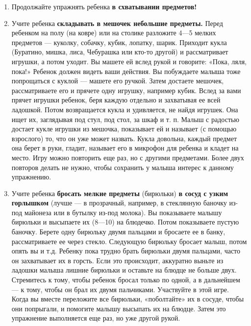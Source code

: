 \documentclass{book}
\begin{document}
\begin{enumerate}
\def\labelenumi{\arabic{enumi}.}
\item
  
  Продолжайте упражнять ребенка \textbf{в схватывании предметов!}
  
\item
  
  Учите ребенка \textbf{складывать в мешочек небольшие предметы.}
Перед ребенком на полу (на ковре) или на столике разложите 4---5 мелких
предметов --- куколку, собачку, кубик, лопатку, шарик. Приходит кукла
(Буратино, мишка, лиса, Чебурашка или кто-то другой) и рассматривает
игрушки, а потом уходит. Вы машете ей вслед рукой и говорите: «Пока,
ляля, пока!» Ребенок должен видеть ваши действия. Вы побуждаете малыша
тоже попрощаться с куклой --- машете его ручкой. Затем достаете мешочек,
рассматриваете его и прячете одну игрушку, например кубик. Вслед за вами
прячет игрушки ребенок, беря каждую отдельно и захватывая ее всей
ладошкой. Потом возвращается кукла и удивляется, не найдя игрушек. Она
ищет их, заглядывая под стул, под стол, за шкаф и т. п. Малыш с радостью
достает кукле игрушки из мешочка, показывает ей и называет (с помощью
взрослого) то, что он уже может назвать. Кукла довольна, каждый предмет
она берет в руки, гладит, называет его в микрофон для ребенка и кладет
на место. Игру можно повторить еще раз, но с другими предметами. Более
двух повторов делать не нужно, чтобы сохранить у малыша интерес к
данному упражнению.

\item
  
  Учите ребенка \textbf{бросать мелкие предметы} (бирюльки) \textbf{в
  сосуд с узким горлышком} (лучше --- в прозрачный, например, в
  стеклянную баночку из-под майонеза или в бутылку из-под молока). Вы
  показываете малышу бирюльки и высыпаете их (8---10) на блюдечко. Потом
  показываете пустую баночку. Берете одну бирюльку двумя пальцами и
  бросаете ее в банку, рассматриваете ее через стекло. Следующую
  бирюльку бросает малыш, потом опять вы и т.д. Ребенку пока трудно
  брать бирюльки двумя пальцами, часто он захватывает их в горсть. Если
  это происходит, аккуратно выньте из ладошки малыша лишние бирюльки и
  оставьте на блюдце не больше двух. Стремитесь к тому, чтобы ребенок
  бросал только по одной, а в дальнейшем --- к тому, чтобы он брал их
  двумя пальчиками. Участвуйте в этой игре. Когда вы вместе переложите
  все бирюльки, «поболтайте» их в сосуде, чтобы они попрыгали, и
  помогите малышу высыпать их на блюдце. Затем это упражнение
  выполняется еще раз, но уже другой рукой.


\end{enumerate}
\end{document}
